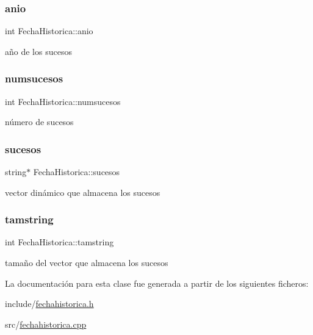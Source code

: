 \subsubsection{\texorpdfstring{anio}{anio}}
{\footnotesize\ttfamily int Fecha\+Historica\+::anio\hspace{0.3cm}{\ttfamily [private]}}

año de los sucesos \mbox{\label{classFechaHistorica_a92979fbdc8d9575f18092759f4f192cb}} 
\subsubsection{\texorpdfstring{numsucesos}{numsucesos}}
{\footnotesize\ttfamily int Fecha\+Historica\+::numsucesos\hspace{0.3cm}{\ttfamily [private]}}

número de sucesos \mbox{\label{classFechaHistorica_a31f925ce9ed8b6d420480295724965a8}} 
\subsubsection{\texorpdfstring{sucesos}{sucesos}}
{\footnotesize\ttfamily string$\ast$ Fecha\+Historica\+::sucesos\hspace{0.3cm}{\ttfamily [private]}}

vector dinámico que almacena los sucesos \mbox{\label{classFechaHistorica_aec4c1897c2fbc123365211ca065783a0}} 
\subsubsection{\texorpdfstring{tamstring}{tamstring}}
{\footnotesize\ttfamily int Fecha\+Historica\+::tamstring\hspace{0.3cm}{\ttfamily [private]}}

tamaño del vector que almacena los sucesos 

La documentación para esta clase fue generada a partir de los siguientes ficheros\+:\begin{DoxyCompactItemize}
\item 
include/\hyperlink{fechahistorica_8h}{fechahistorica.\+h}\item 
src/\hyperlink{fechahistorica_8cpp}{fechahistorica.\+cpp}\end{DoxyCompactItemize}
